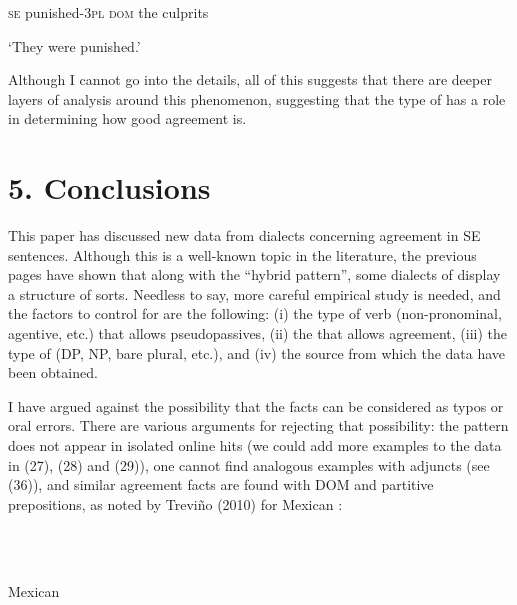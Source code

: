 \documentclass[output=paper]{langsci/langscibook}
\begin{document}
\begin{styleHTMLPreformatted}
                     \textsc{se} punished{}-\textsc{3pl}  \textsc{dom} the   culprits
\end{styleHTMLPreformatted}

\begin{styleHTMLPreformatted}
            ‘They were punished.’
\end{styleHTMLPreformatted}

\begin{styleHTMLPreformatted}
Although I cannot go into the details, all of this suggests that there are deeper layers of analysis around this phenomenon, suggesting that the type of  has a role in determining how good agreement is.
\end{styleHTMLPreformatted}

\section{ 5. Conclusions}

\begin{styleHTMLPreformatted}
This paper has discussed new data from  dialects concerning agreement in SE sentences. Although this is a well-known topic in the literature, the previous pages have shown that along with the “hybrid pattern”, some dialects of  display a  structure of sorts. Needless to say, more careful empirical study is needed, and the factors to control for are the following: (i) the type of verb (non-pronominal, agentive, etc.) that allows pseudopassives, (ii) the  that allows agreement, (iii) the type of  (DP, NP, bare plural, etc.), and (iv) the source from which the data have been obtained. 
\end{styleHTMLPreformatted}

\begin{styleHTMLPreformatted}
  I have argued against the possibility that the facts can be considered as typos or oral errors. There are various arguments for rejecting that possibility: the pattern does not appear in isolated online hits (we could add more examples to the data in (27), (28) and (29)), one cannot find analogous examples with adjuncts (see (36)), and similar agreement facts are found with DOM and partitive prepositions, as noted by Treviño (2010) for Mexican :
\end{styleHTMLPreformatted}

\begin{styleHTMLPreformatted}
\ea%
    \label{ex:key:43}
    \gll\\
        \\
    \glt
    \z

            Mexican 
\end{styleHTMLPreformatted}
\end{document}
